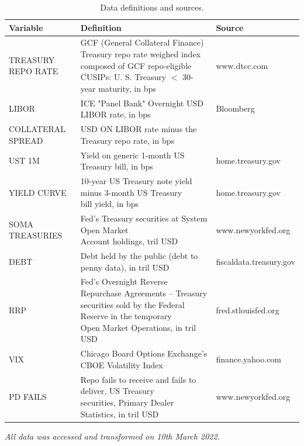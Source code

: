 \documentclass[11pt,a4paper,english,oneside]{article}
\begin{document}
\begin{table} \centering
  \caption{Data definitions and sources.}
\label{table:variables}
{\renewcommand{\arraystretch}{2.2} 
\begin{tabular}{lll}
\toprule
  \textbf{Variable} & \textbf{Definition} & \textbf{Source} \\
\midrule
  TREASURY REPO RATE &  \makecell[l]{GCF (General Collateral Finance) Treasury repo rate\\weighed index composed of GCF repo-eligible CUSIPs:\\U. S. Treasury $<$ 30-year maturity, in bps} & www.dtcc.com\\
\hline
  LIBOR & ICE "Panel Bank" Overnight USD LIBOR rate, in bps & Bloomberg\\
\hline
  COLLATERAL SPREAD & USD ON LIBOR rate minus the Treasury repo rate, in bps & \\
\hline
  UST 1M & Yield on generic 1-month US Treasury bill, in bps & home.treasury.gov\\
\hline
  YIELD CURVE & \makecell[l]{10-year US Treasury note yield  minus 3-month US Treasury\\bill yield, in bps} & home.treasury.gov\\
\hline
  SOMA TREASURIES & \makecell[l]{Fed's Treasury securities at System Open Market\\Account holdings, tril USD} & www.newyorkfed.org\\
\hline
  DEBT & Debt held by the public (debt to penny data), in tril USD & fiscaldata.treasury.gov\\
\hline
  RRP & \makecell[l]{Fed's Overnight Reverse Repurchase Agreements -- Treasury\\securities sold by the Federal Reserve in the temporary\\Open Market Operations, in tril USD} & fred.stlouisfed.org\\
\hline
  VIX & Chicago Board Options Exchange's CBOE Volatility Index & finance.yahoo.com\\
\hline
  PD FAILS & \makecell[l]{Repo fails to receive and fails to deliver, US Treasury\\securities, Primary Dealer Statistics, in tril USD} & www.newyorkfed.org \\
  \bottomrule
\end{tabular}}
\begin{flushleft}
  \hspace{50pt} \textit{All data was accessed and transformed on 10th March 2022.}
\end{flushleft}
\end{table}
\end{document}
